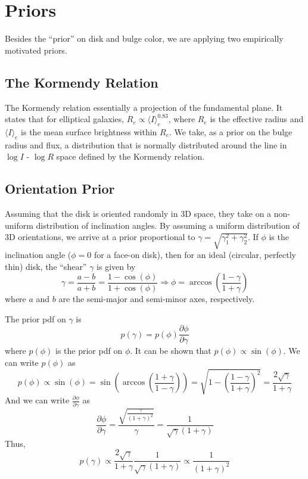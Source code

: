 \documentclass{article}
\begin{document}
\section{Priors}
Besides the ``prior'' on disk and bulge color, we are applying two
empirically motivated priors.
\subsection{The Kormendy Relation}
The Kormendy relation essentially a projection of the fundamental
plane.  It states that for elliptical galaxies,
$R_e \propto \langle I \rangle_e^{0.83}$, where $R_e$ is the effective radius
and $\langle I \rangle_e$ is the mean surface brightness within $R_e$.
We take, as a prior on the bulge radius and flux, a
distribution that is normally distributed around the line in $\log I$
- $\log R$ space defined by the Kormendy relation.

\subsection{Orientation Prior}
Assuming that the disk is oriented randomly in 3D space,
they take on a non-uniform distribution of inclination angles.  By
assuming a uniform distribution of 3D orientations, we arrive at a
 prior proportional to $\gamma = \sqrt{\gamma_1^2 + \gamma_2^2}$.
If $\phi$ is the inclination angle ($\phi = 0$ for a face-on disk), then for an ideal
(circular, perfectly thin) disk, the ``shear'' $\gamma$ is given by
\[
\gamma = \frac{a - b}{a + b} = \frac{1 - \cos(\phi)}{1 + \cos(\phi)}
\Rightarrow \phi = \arccos{\left( \frac{1 - \gamma}{1 + \gamma} \right) }
\]
where $a$ and $b$ are the semi-major and semi-minor axes, respectively.

The prior pdf on $\gamma$ is
\[
p(\gamma) = p(\phi) \frac{\partial \phi}{\partial \gamma}
\]
where $p(\phi)$ is the prior pdf on $\phi$. It can be shown that
$p(\phi) \propto \sin (\phi)$.  We can write $p(\phi)$ as
\[
p(\phi) \propto \sin(\phi)
= \sin \left( \arccos \left( \frac{1 + \gamma}{1 - \gamma} \right) \right)
= \sqrt{1 - \left( \frac{1 - \gamma}{1 + \gamma} \right)^2}
= \frac{2 \sqrt{\gamma}}{1 + \gamma}
\]
And we can write $\frac{\partial \phi}{\partial \gamma}$ as
\[
\frac{\partial \phi}{\partial \gamma}
= \frac{\sqrt{\frac{\gamma}{(1 + \gamma)^2}}}{\gamma}
= \frac{1}{\sqrt{\gamma} (1 + \gamma)}
\]
Thus,
\[
p(\gamma) \propto \frac{2 \sqrt{\gamma}}{1 + \gamma} \frac{1}{\sqrt{\gamma} (1 + \gamma)}
\propto \frac{1}{(1 + \gamma)^2}
\]
\end{document}

